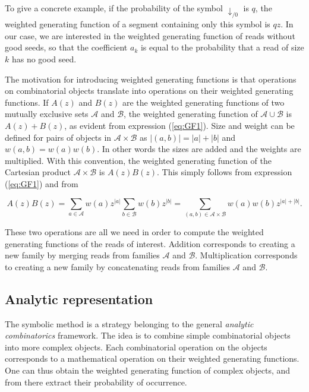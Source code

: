 \documentclass{article}
\begin{document}
To give a concrete example, if the probability of the symbol
$\downarrow_{/0}$ is $q$, the weighted generating function of a segment
containing only this symbol is $qz$. In our case, we are interested in the
weighted generating function of reads without good seeds, so that the
coefficient $a_k$ is equal to the probability that a read of size $k$ has
no good seed.

The motivation for introducing weighted generating functions is that
operations on combinatorial objects translate into operations on their
weighted generating functions. If $A(z)$ and $B(z)$ are the weighted
generating functions of two mutually exclusive sets $\mathcal{A}$ and
$\mathcal{B}$, the weighted generating function of $\mathcal{A} \cup
\mathcal{B}$ is $A(z) + B(z)$, as evident from expression (\ref{eq:GF1}).
Size and weight can be defined for pairs of objects in $\mathcal{A} \times
\mathcal{B}$ as $|(a,b)| = |a| + |b|$ and $w(a,b) = w(a)w(b)$. In other
words the sizes are added and the weights are multiplied.  With this
convention, the weighted generating function of the Cartesian product
$\mathcal{A} \times \mathcal{B}$ is $A(z)B(z)$. This simply follows from
expression (\ref{eq:GF1}) and from

\begin{equation*}
A(z)B(z) =
\sum_{a\in \mathcal{A}}w(a)z^{|a|} \sum_{b\in \mathcal{B}}w(b)z^{|b|}
= \sum_{(a,b) \in \mathcal{A} \times \mathcal{B}} w(a)w(b)z^{|a|+|b|}.
\end{equation*}

These two operations are all we need in order to compute the weighted
generating functions of the reads of interest. Addition corresponds to
creating a new family by merging reads from families $\mathcal{A}$ and
$\mathcal{B}$. Multiplication corresponds to creating a new family by
concatenating reads from families $\mathcal{A}$ and $\mathcal{B}$.

\subsection{Analytic representation}

The symbolic method is a strategy belonging to the general \emph{analytic
combinatorics} framework. The idea is to combine simple combinatorial
objects into more complex objects. Each combinatorial operation on the
objects corresponds to a mathematical operation on their weighted
generating functions. One can thus obtain the weighted generating function
of complex objects, and from there extract their probability of
occurrence.
\end{document}
